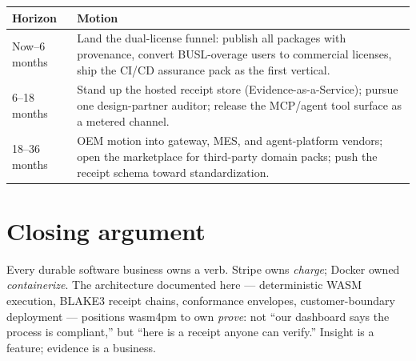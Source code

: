 \begin{center}
\begin{tabularx}{\textwidth}{lX}
\toprule
\textbf{Horizon} & \textbf{Motion} \\
\midrule
Now--6 months & Land the dual-license funnel: publish all packages with provenance, convert BUSL-overage users to commercial licenses, ship the CI/CD assurance pack as the first vertical. \\
6--18 months & Stand up the hosted receipt store (Evidence-as-a-Service); pursue one design-partner auditor; release the MCP/agent tool surface as a metered channel. \\
18--36 months & OEM motion into gateway, MES, and agent-platform vendors; open the marketplace for third-party domain packs; push the receipt schema toward standardization. \\
\bottomrule
\end{tabularx}
\end{center}

\section{Closing argument}

Every durable software business owns a verb. Stripe owns \emph{charge};
Docker owned \emph{containerize}. The architecture documented here ---
deterministic WASM execution, BLAKE3 receipt chains, conformance envelopes,
customer-boundary deployment --- positions wasm4pm to own \emph{prove}: not
``our dashboard says the process is compliant,'' but ``here is a receipt
anyone can verify.'' Insight is a feature; evidence is a business.
